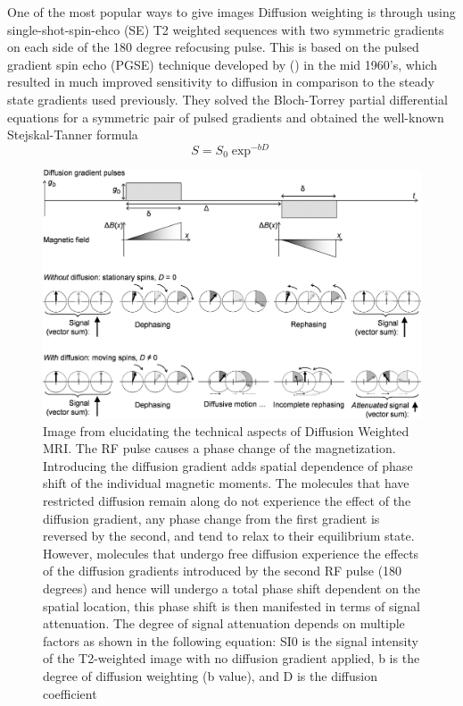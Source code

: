 \documentclass[msthesis.tex]{subfiles}
\begin{document}
One of the most popular ways to give images Diffusion weighting is through using single-shot-spin-ehco (SE) T2 weighted sequences with two symmetric gradients on each side of the 180 degree refocusing pulse. This is based on the pulsed gradient spin echo (PGSE) technique developed by (\cite{stejskal1965spin}) in the mid 1960's, which resulted in much improved sensitivity to diffusion in comparison to the steady state gradients used previously. They solved the Bloch-Torrey partial differential equations for a symmetric pair of pulsed gradients and obtained the well-known Stejskal-Tanner formula
\begin{equation}
\label{eq:Stetjskal}
S = S_0 \exp^{-bD}
\end{equation}
\begin{figure}
    \centering
    \includegraphics[width=\textwidth]{images/diffusionmri.jpg}
    \caption{Image from \cite{technical_aspects_dmri} elucidating the technical aspects of Diffusion Weighted MRI. The RF pulse causes a phase change of the magnetization. Introducing the diffusion gradient adds spatial dependence of phase shift of the individual magnetic moments. The molecules that have restricted diffusion remain along do not experience the effect of the diffusion gradient, any phase change from the first gradient is reversed by the second,  and tend to relax to their equilibrium state. However, molecules that undergo free diffusion experience the effects of the diffusion gradients introduced by the second RF pulse (180 degrees) and hence will undergo a total phase shift dependent on the spatial location, this phase shift is then manifested in terms of signal attenuation.  The degree of signal attenuation depends on multiple factors as shown in the following equation: SI0 is the signal intensity of the T2-weighted image with no diffusion gradient applied, b is the degree of diffusion weighting (b value), and D is the diffusion coefficient  }
    \label{fig:diffmri}
\end{figure}
\end{document}
